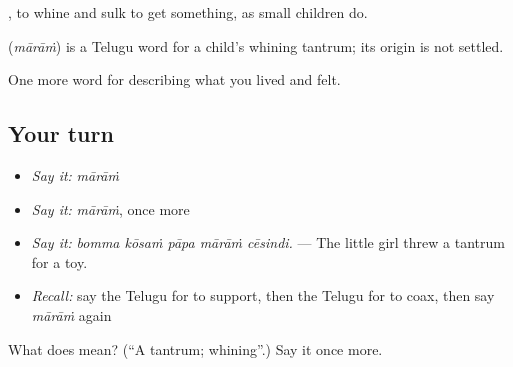 , to whine and sulk to get something, as small children do.

\begin{cousinweb}
\textbf{} (\emph{mārāṁ}) is a Telugu word for a child's whining tantrum; its origin is not settled.
\end{cousinweb}

\begin{grammarlens}[title={What you've built}]
One more word for describing what you lived and felt.
\end{grammarlens}

\subsection*{Your turn}
\begin{itemize}
\raggedright
  \item \emph{Say it:} \emph{mārāṁ}
  \item \emph{Say it:} \emph{mārāṁ}, once more
  \item \emph{Say it:} \emph{bomma kōsaṁ pāpa mārāṁ cēsindi.} — The little girl threw a tantrum for a toy.
  \item \emph{Recall:} say the Telugu for to support, then the Telugu for to coax, then say \emph{mārāṁ} again
\end{itemize}

\begin{tcolorbox}[breakable,colback=teal!4,colframe=teal!35!black,title={Before you move on}]
What does  mean? (\textquotedblleft{}A tantrum; whining\textquotedblright{}.) Say it once more.
\end{tcolorbox}
